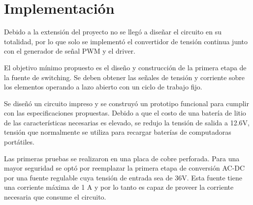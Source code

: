 \section{Implementación}

Debido a la extensión del proyecto no se llegó a diseñar el circuito en su totalidad,
por lo que solo se implementó el convertidor de tensión continua
junto con el generador de señal PWM y el driver.

El objetivo mínimo propuesto es el diseño y construcción de la primera etapa de la fuente de switching. 
Se deben obtener las señales de tensión y corriente sobre los elementos operando a lazo abierto con un ciclo de trabajo fijo. 

Se diseñó un circuito impreso y se construyó un prototipo funcional para cumplir con las especificaciones propuestas. 
Debido a que el costo de una batería de litio de las características necesarias es elevado,
se redujo la tensión de salida a 12.6V, tensión que normalmente se utiliza para recargar baterías de computadoras portátiles.

Las primeras pruebas se realizaron en una placa de cobre perforada. 
Para una mayor seguridad se optó por reemplazar la primera etapa de conversión AC-DC por una fuente regulable cuya tensión de entrada sea de 36V.
Esta fuente tiene una corriente máxima de 1 A y por lo tanto es capaz de proveer la corriente necesaria que consume el circuito.